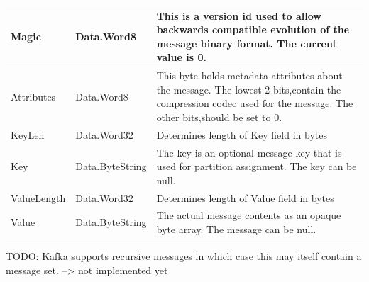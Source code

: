 \begin{table}[H]
\centering
\begin{tabular}{ l  l  p{10cm} }
\hline
Magic       & Data.Word8      & This is a version id used to allow backwards compatible evolution of the message binary format. The current value is 0.                                         \\ \hline
Attributes  & Data.Word8      & This byte holds metadata attributes about the message. The lowest 2 bits,contain the compression codec used for the message. The other bits,should be set to 0. \\ \hline
KeyLen      & Data.Word32     & Determines length of Key field in bytes                                                                                                                         \\ \hline
Key         & Data.ByteString & The key is an optional message key that is used for partition assignment. The key can be null.                                                                  \\ \hline
ValueLength & Data.Word32     & Determines length of Value field in bytes                                                                                                                       \\ \hline
Value       & Data.ByteString & The actual message contents as an opaque byte array. The message can be null.                                                                                   \\ \hline
\end{tabular}
\end{table}

TODO: Kafka supports recursive messages in which case this may itself contain a message set. --> not implemented yet  




